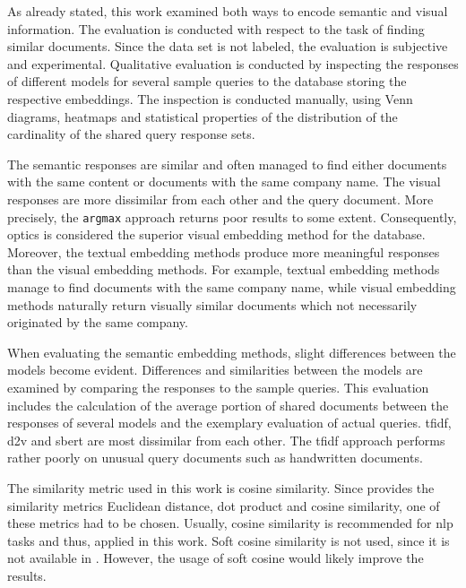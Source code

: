 As already stated, this work examined both ways to encode semantic and visual information.
The evaluation is conducted with respect to the task of finding similar documents.
Since the data set is not labeled, the evaluation is subjective and experimental.
Qualitative evaluation is conducted by inspecting the responses of different models for several sample queries to the database 
storing the respective embeddings.
The inspection is conducted manually, 
using Venn diagrams, heatmaps and 
statistical properties of the distribution of the cardinality of the shared query response sets.

The semantic responses are similar and often managed to find either documents with the same content or documents with the same company name.
The visual responses are more dissimilar from each other and the query document.
More precisely, the \texttt{argmax} approach returns poor results to some extent.
Consequently, \ac{optics} is considered the superior visual embedding method for the database.
Moreover, the textual embedding methods produce more meaningful responses than the visual embedding methods.
For example, textual embedding methods manage to find documents with the same company name, 
while visual embedding methods naturally return visually similar documents which not necessarily originated by the same company.


When evaluating the semantic embedding methods, slight differences between the models become evident.
Differences and similarities between the models are examined by comparing the responses to the sample queries.
This evaluation includes the calculation of the average portion of shared documents between the responses of several models 
and the exemplary evaluation of actual queries.
\ac{tfidf}, \ac{d2v} and \ac{sbert} are most dissimilar from each other.
The \ac{tfidf} approach performs rather poorly on unusual query documents such as handwritten documents.


The similarity metric used in this work is cosine similarity.
Since \databaseName{} provides the similarity metrics Euclidean distance, dot product and cosine similarity,
one of these metrics had to be chosen.
Usually, cosine similarity is recommended for \ac{nlp} tasks and thus, applied in this work.
Soft cosine similarity is not used, since it is not available in \databaseName{}.
However, the usage of soft cosine would likely improve the results.

